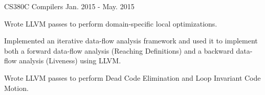
\begin{cventries}

  \cvresearchentry
    {CS380C Compilers} %
    {Jan. 2015 - May. 2015} %
    {
      \begin{cvitems} %
      \item Wrote LLVM passes to perform domain-specific local optimizations.
      \item Implemented an iterative data-flow analysis framework and used it to
        implement both a forward data-flow analysis (Reaching Definitions) and a
        backward data-flow analysis (Liveness) using LLVM.
      \item Wrote LLVM passes to perform Dead Code Elimination and Loop Invariant
        Code Motion.
      \end{cvitems}
    }
  
\end{cventries}
